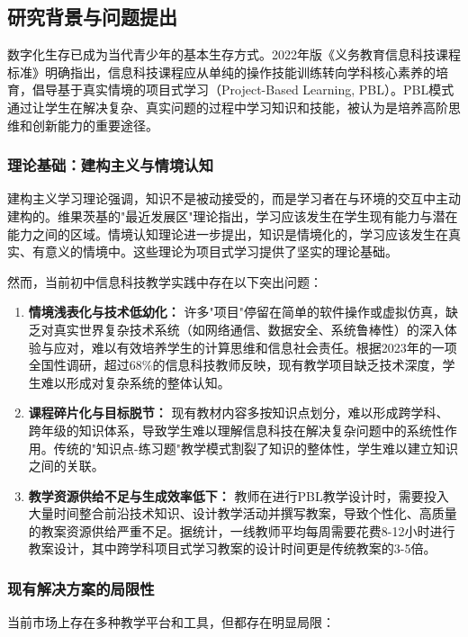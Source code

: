 \documentclass[12pt,a4paper,fontset=fandol]{ctexart}
\begin{document}
\subsection{研究背景与问题提出}
数字化生存已成为当代青少年的基本生存方式。2022年版《义务教育信息科技课程标准》明确指出，信息科技课程应从单纯的操作技能训练转向学科核心素养的培育，倡导基于真实情境的项目式学习（Project-Based Learning, PBL）\cite{moe2022}。PBL模式通过让学生在解决复杂、真实问题的过程中学习知识和技能，被认为是培养高阶思维和创新能力的重要途径\cite{thomas2000}。

\subsubsection{理论基础：建构主义与情境认知}
建构主义学习理论强调，知识不是被动接受的，而是学习者在与环境的交互中主动建构的\cite{constructivism}。维果茨基的"最近发展区"理论指出，学习应该发生在学生现有能力与潜在能力之间的区域\cite{vygotsky1978}。情境认知理论进一步提出，知识是情境化的，学习应该发生在真实、有意义的情境中\cite{brown1989}。这些理论为项目式学习提供了坚实的理论基础。

然而，当前初中信息科技教学实践中存在以下突出问题：

\begin{enumerate}[label=(\arabic*)]
    \item \textbf{情境浅表化与技术低幼化：} 许多"项目"停留在简单的软件操作或虚拟仿真，缺乏对真实世界复杂技术系统（如网络通信、数据安全、系统鲁棒性）的深入体验与应对，难以有效培养学生的计算思维和信息社会责任。根据2023年的一项全国性调研\cite{survey2023}，超过68\%的信息科技教师反映，现有教学项目缺乏技术深度，学生难以形成对复杂系统的整体认知。
    
    \item \textbf{课程碎片化与目标脱节：} 现有教材内容多按知识点划分，难以形成跨学科、跨年级的知识体系，导致学生难以理解信息科技在解决复杂问题中的系统性作用。传统的"知识点-练习题"教学模式割裂了知识的整体性，学生难以建立知识之间的关联\cite{leihua}。
    
    \item \textbf{教学资源供给不足与生成效率低下：} 教师在进行PBL教学设计时，需要投入大量时间整合前沿技术知识、设计教学活动并撰写教案，导致个性化、高质量的教案资源供给严重不足。据统计\cite{teacher2023}，一线教师平均每周需要花费8-12小时进行教案设计，其中跨学科项目式学习教案的设计时间更是传统教案的3-5倍。
\end{enumerate}

\subsubsection{现有解决方案的局限性}
当前市场上存在多种教学平台和工具，但都存在明显局限：
\end{document}

